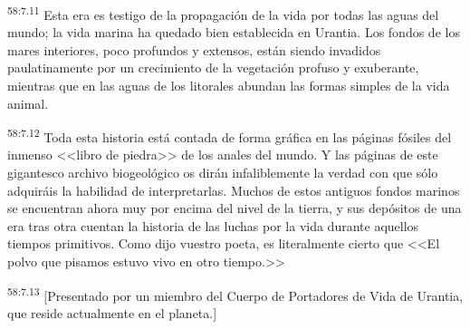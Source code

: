 \par
\textsuperscript{58:7.11} Esta era es testigo de la propagación de la vida por todas las aguas del mundo; la vida marina ha quedado bien establecida en Urantia. Los fondos de los mares interiores, poco profundos y extensos, están siendo invadidos paulatinamente por un crecimiento de la vegetación profuso y exuberante, mientras que en las aguas de los litorales abundan las formas simples de la vida animal.

\par
\textsuperscript{58:7.12} Toda esta historia está contada de forma gráfica en las páginas fósiles del inmenso <<libro de piedra>> de los anales del mundo. Y las páginas de este gigantesco archivo biogeológico os dirán infaliblemente la verdad con que sólo adquiráis la habilidad de interpretarlas. Muchos de estos antiguos fondos marinos se encuentran ahora muy por encima del nivel de la tierra, y sus depósitos de una era tras otra cuentan la historia de las luchas por la vida durante aquellos tiempos primitivos. Como dijo vuestro poeta, es literalmente cierto que <<El polvo que pisamos estuvo vivo en otro tiempo.>>

\par
\textsuperscript{58:7.13} [Presentado por un miembro del Cuerpo de Portadores de Vida de Urantia, que reside actualmente en el planeta.]